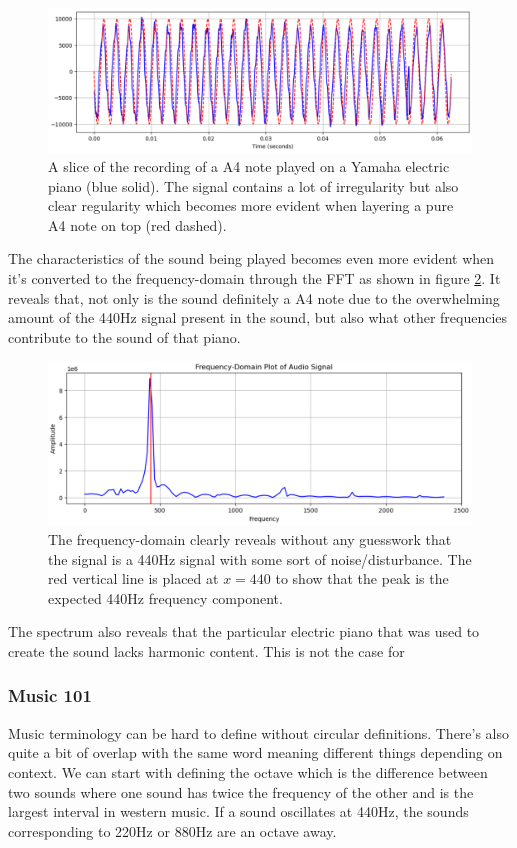 \begin{figure}[ht]
    \centering
    \includegraphics[width=\textwidth]{./images/piano_wave.png}
    \caption{A slice of the recording of a A4 note played on a Yamaha electric piano (blue solid). The signal contains a lot of irregularity but also clear regularity which becomes more evident when layering a pure A4 note on top (red dashed).\label{fig:pianoWave}}
\end{figure}

The characteristics of the sound being played becomes even more evident when it's converted to the frequency-domain through the FFT as shown in figure \ref{fig:pianoFreq}. It reveals that, not only is the sound definitely a A4 note due to the overwhelming amount of the 440Hz signal present in the sound, but also what other frequencies contribute to the sound of that piano. 

\begin{figure}[ht]
    \centering
    \includegraphics[width=\textwidth]{./images/piano_freq.png}
    \caption{The frequency-domain clearly reveals without any guesswork that the signal is a 440Hz signal with some sort of noise/disturbance. The red vertical line is placed at $x=440$ to show that the peak is the expected 440Hz frequency component.\label{fig:pianoFreq}}
\end{figure}

The spectrum also reveals that the particular electric piano that was used to create the sound lacks harmonic content. This is not the case for  

\subsubsection{Music 101} 
Music terminology can be hard to define without circular definitions. There's also quite a bit of overlap with the same word meaning different things depending on context. We can start with defining the octave which is the difference between two sounds where one sound has twice the frequency of the other and is the largest interval in western music. If a sound oscillates at 440Hz, the sounds corresponding to 220Hz or 880Hz are an octave away.

